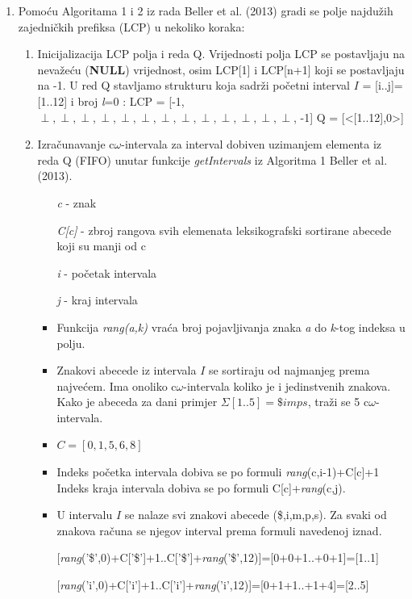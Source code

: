 \documentclass[a4paper,12pt]{article}
\begin{document}
\begin{enumerate}
	\item Pomoću Algoritama 1 i 2 iz rada Beller et al. (2013) gradi se polje najdužih zajedničkih prefiksa (LCP) u nekoliko koraka:
	\begin{enumerate}
		\item Inicijalizacija LCP polja i reda Q. Vrijednosti polja LCP se postavljaju na nevažeću (\textbf{NULL}) vrijednost, osim LCP[1] i LCP[n+1] koji se postavljaju na -1. U red Q stavljamo strukturu koja sadrži početni interval $I$ = [i..j]=[1..12] i broj \textit{l}=0 :\newline
	 	LCP = [-1,$\perp,\perp,\perp,\perp,\perp,\perp,\perp,\perp,\perp,\perp,\perp,\perp, \perp$, -1]\newline
		Q = [<[1..12],0>]
		\item Izračunavanje c$\omega$-intervala za interval dobiven uzimanjem elementa iz reda Q (FIFO) unutar funkcije \textit{getIntervals} iz Algoritma 1 Beller et al. (2013).
			\begin{itemize}
			\renewcommand\labelitemi{--}
			    \item[] \textit{c} - znak
			    \item[] \textit{C[c]} - zbroj rangova svih elemenata leksikografski sortirane abecede koji su manji od c
			    \item[] \textit{i} - početak intervala
			    \item[] \textit{j} - kraj intervala
			    \item Funkcija \textit{rang(a,k)} vraća broj pojavljivanja znaka \textit{a} do \textit{k}-tog indeksa u polju. 
			    \item Znakovi abecede iz intervala $I$ se sortiraju od najmanjeg prema najvećem. Ima onoliko c$\omega$-intervala koliko je i jedinstvenih znakova. Kako je abeceda za dani primjer $\Sigma[1..5]=\$imps$, traži se 5 c$\omega$-intervala.
			    \item $C = [0,1,5,6,8]$
			    \item Indeks početka intervala dobiva se po formuli \textit{rang}(c,i-1)+C[c]+1 Indeks kraja intervala dobiva se po formuli C[c]+\textit{rang}(c,j).
			    \item U intervalu $I$ se nalaze svi znakovi abecede (\$,i,m,p,s). Za svaki od znakova računa se njegov interval prema formuli navedenoj iznad.\newline
			    \item[]  [\textit{rang}('\$',0)+C['\$']+1..C['\$']+\textit{rang}('\$',12)]=[0+0+1..+0+1]=[1..1]
			    \item[]  [\textit{rang}('i',0)+C['i']+1..C['i']+\textit{rang}('i',12)]=[0+1+1..+1+4]=[2..5]

\end{itemize}
\end{enumerate}
\end{enumerate}
\end{document}
